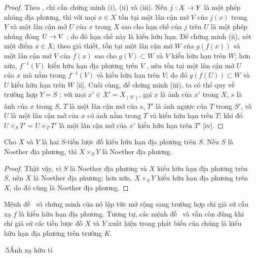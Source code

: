 \documentclass[oneside]{amsart}
\makeatletter
\renewcommand*{\section}{%
  \@startsection{section}{1}{\z@}{.7\linespacing\@plus\linespacing}%
  {.5\linespacing}{\normalfont\bfseries\Large\scshape\centering}}
\newcommand{\ega@arrow}[2]{\mathchoice{#1}{#2}{#2}{#2}}
\renewcommand{\to}{\ega@arrow{\longrightarrow}{\rightarrow}}
\newcommand{\oldpage}[2][]{{\marginnote{\normalfont\textbf{#1}~|~#2}}\ignorespaces}
\let\EGAOriginalLabel\label
\renewcommand{\label}[1]{\phantomsection\EGAOriginalLabel{#1}}
\makeatother
\begin{document}
\begin{proof}
Theo , chỉ cần chứng minh (i), (ii) và (iii).
Nếu $j:X\to Y$ là một phép nhúng địa phương, thì với mọi $x\in X$ tồn tại một lân cận mở $V$ của $j(x)$ trong $Y$ và một lân cận mở $U$ của $x$ trong $X$ sao cho hạn chế của $j$ trên $U$ là một phép nhúng đóng $U\to V$ ; do đó hạn chế này là kiểu hữu hạn.
Để chứng minh (ii), xét một điểm $x\in X$;
theo giả thiết, tồn tại một lân cận mở $W$ của $g(f(x))$ và một lân cận mở $V$ của $f(x)$ sao cho $g(V)\subset W$ và $V$ kiểu hữu hạn trên $W$;
hơn nữa, $f^{-1}(V)$ kiểu hữu hạn địa phương trên $V$ , nên tồn tại một lân cận mở $U$ của $x$ mà
\oldpage[I]{155}
nằm trong $f^{-1}(V)$ và kiểu hữu hạn trên $V$;
do đó $g(f(U))\subset W$ và $U$ kiểu hữu hạn trên $W$ [ii].
Cuối cùng, để chứng minh (iii), ta có thể quy về trường hợp $Y=S$ ;
với mọi $x'\in X'=X_{(S')}$, gọi $x$ là ảnh của $x'$ trong $X$, $s$ là ảnh của $x$ trong $S$, $T$ là một lân cận mở của $s$, $T'$ là ảnh ngược của $T$ trong $S'$, và $U$ là một lân cận mở của $x$ có ảnh nằm trong $T$ và kiểu hữu hạn trên $T$;
khi đó $U\times_S T'=U\times_T T'$ là một lân cận mở của $x'$  kiểu hữu hạn trên $T'$ [iv].
\end{proof}

\begin{corollary}[6.6.7]
\label{I.6.6.7}
Cho $X$ và $Y$ là hai $S$-tiền lược đồ kiểu hữu hạn địa phương trên $S$.
Nếu $S$ là Noether địa phương, thì $X\times_S Y$ là Noether địa phương.
\end{corollary}

\begin{proof}
Thật vậy, vì $S$ là Noether địa phương và $X$ kiểu hữu hạn địa phương trên $S$, nên $X$ là Noether địa phương; hơn nữa, $X\times_S Y$ kiểu hữu hạn địa phương trên $X$, do đó cũng là Noether địa phương.
\end{proof}

\begin{remark}[6.6.8]
\label{I.6.6.8}
Mệnh đề~ và chứng minh của nó lập tức mở rộng sang trường hợp chỉ giả sử cấu xạ $f$ là kiểu hữu hạn địa phương.
Tương tự, các mệnh đề~ và  vẫn còn đúng khi chỉ giả sử các tiền lược đồ $X$ và $Y$ xuất hiện trong phát biểu của chúng là kiểu hữu hạn địa phương trên trường $K$.
\end{remark}

\section{Ánh xạ hữu tỉ}
\label{section:I.7}
\end{document}
